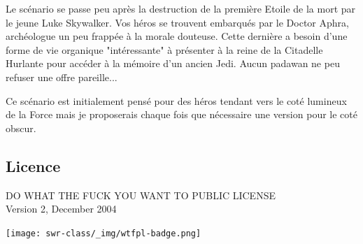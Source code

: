 \documentclass{jdrp}
\begin{document}
    Le scénario se passe peu après la destruction de la première Etoile de la mort par le jeune Luke Skywalker. Vos héros se trouvent embarqués par le Doctor Aphra, archéologue un peu frappée à la morale douteuse. Cette dernière a besoin d’une forme de vie organique "intéressante" à présenter à la reine de la Citadelle Hurlante pour accéder à la mémoire d’un ancien Jedi. Aucun padawan ne peu refuser une offre pareille...

    \bigbreak

    Ce scénario est initialement pensé pour des héros tendant vers le coté lumineux de la Force mais je proposerais chaque fois que nécessaire une version pour le coté obscur.

    \vspace*{\fill}

	\subsection{Licence}
	\noindent DO WHAT THE FUCK YOU WANT TO PUBLIC LICENSE\\
    Version 2, December 2004
    \vspace{-2.5\baselineskip}
	\begin{flushright}
		\texttt{[image: swr-class/\_img/wtfpl-badge.png]}
	\end{flushright}

	\twocolumn

	
    
    
	
	

	\onecolumn
	\nocite{*}
	\printbibliography
\end{document}
